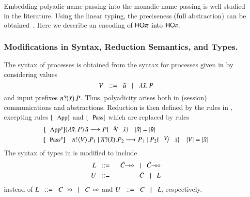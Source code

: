 \noi Embedding polyadic name passing 
into the monadic name passing is well-studied in the literature.    
Using the linear typing, 
the preciseness (full abstraction) can be obtained~\cite{Yoshida96}.
Here we describe an encoding of $\pHOp$ into $\mathsf{HO}\pi$. 




\subsubsection{Modifications in Syntax, Reduction Semantics, and Types.}
The syntax of 
\pHOp processes is obtained from the syntax for processes given in 
 by considering values 
$$V \;\;::=\;\; \tilde{u} \;\;\;|\;\;\; \lambda \tilde{x}.\,P$$
and input prefixes $n ? (\tilde{x}) . P$.
Thus, polyadicity arises both in (session) communications and abstractions. 
Reduction is then defined by the rules in , excepting 
 rules $\orule{App}$ and $\orule{Pass}$ which are replaced by rules
 \begin{eqnarray*}
	\orule{App$^p$} & 
	\appl{(\abs{\tilde{x}}{P})}{\tilde{u}} \red P \subst{\tilde{u}}{\tilde{x}} \quad |\tilde{x}| = |\tilde{u}| \\
	\orule{Pass$^p$} & 
		\quad \bout{n}{V} P_1 \Par \binp{\dual{n}}{\tilde{x}} P_2 \red P_1 \Par P_2 \subst{V}{\tilde{x}} \quad |V| = |\tilde{x}|
\end{eqnarray*}
The syntax of types in 
is modified to include
 \begin{eqnarray*}
 L & \bnfis & \shot{\tilde{C}} \bnfbar \lhot{\tilde{C}} \\
 U & \bnfis & \tilde{C} \bnfbar L
 \end{eqnarray*}
 instead of $L \bnfis \shot{C} \bnfbar \lhot{C}$ and
$U \;\;::=\;\; C \;\;\;|\;\;\; L$, respectively.


